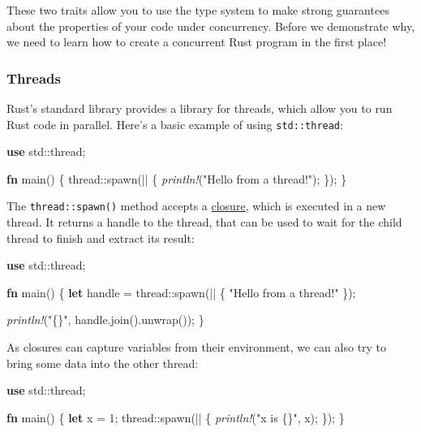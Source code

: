 \documentclass[a4paper,]{book}
\newenvironment{Shaded}{\begin{snugshade}}{\end{snugshade}}
\newcommand{\KeywordTok}[1]{\textcolor[rgb]{0.13,0.29,0.53}{\textbf{{#1}}}}
\newcommand{\DecValTok}[1]{\textcolor[rgb]{0.00,0.00,0.81}{{#1}}}
\newcommand{\StringTok}[1]{\textcolor[rgb]{0.31,0.60,0.02}{{#1}}}
\newcommand{\PreprocessorTok}[1]{\textcolor[rgb]{0.56,0.35,0.01}{\textit{{#1}}}}
\newcommand{\NormalTok}[1]{{#1}}
\begin{document}
These two traits allow you to use the type system to make strong
guarantees about the properties of your code under concurrency. Before
we demonstrate why, we need to learn how to create a concurrent Rust
program in the first place!

\subsubsection{Threads}\label{threads}

Rust's standard library provides a library for threads, which allow you
to run Rust code in parallel. Here's a basic example of using
\texttt{std::thread}:

\begin{Shaded}
\begin{Highlighting}[]
\KeywordTok{use} \NormalTok{std::thread;}

\KeywordTok{fn} \NormalTok{main() \{}
    \NormalTok{thread::spawn(|| \{}
        \PreprocessorTok{println!}\NormalTok{(}\StringTok{"Hello from a thread!"}\NormalTok{);}
    \NormalTok{\});}
\NormalTok{\}}
\end{Highlighting}
\end{Shaded}

The \texttt{thread::spawn()} method accepts a
\protect\hyperlink{sec--closures}{closure}, which is executed in a new
thread. It returns a handle to the thread, that can be used to wait for
the child thread to finish and extract its result:

\begin{Shaded}
\begin{Highlighting}[]
\KeywordTok{use} \NormalTok{std::thread;}

\KeywordTok{fn} \NormalTok{main() \{}
    \KeywordTok{let} \NormalTok{handle = thread::spawn(|| \{}
        \StringTok{"Hello from a thread!"}
    \NormalTok{\});}

    \PreprocessorTok{println!}\NormalTok{(}\StringTok{"\{\}"}\NormalTok{, handle.join().unwrap());}
\NormalTok{\}}
\end{Highlighting}
\end{Shaded}

As closures can capture variables from their environment, we can also
try to bring some data into the other thread:

\begin{Shaded}
\begin{Highlighting}[]
\KeywordTok{use} \NormalTok{std::thread;}

\KeywordTok{fn} \NormalTok{main() \{}
    \KeywordTok{let} \NormalTok{x = }\DecValTok{1}\NormalTok{;}
    \NormalTok{thread::spawn(|| \{}
        \PreprocessorTok{println!}\NormalTok{(}\StringTok{"x is \{\}"}\NormalTok{, x);}
    \NormalTok{\});}
\NormalTok{\}}
\end{Highlighting}
\end{Shaded}
\end{document}
